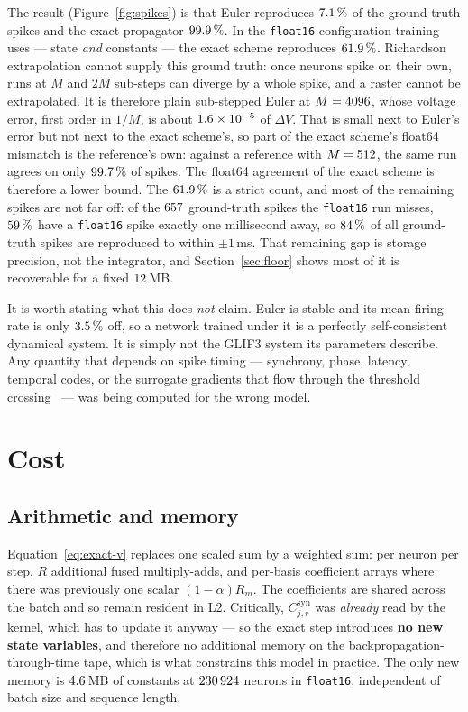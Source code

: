 \documentclass[11pt,a4paper,numbers=noenddot]{scrartcl}
\newcommand{\Csyn}{C^{\mathrm{syn}}}
\newcommand{\amem}{\alpha}
\newcommand{\code}[1]{\texttt{\small #1}}
\begin{document}
The result (Figure~\ref{fig:spikes}) is that Euler reproduces
$7.1\,\%$ of the ground-truth spikes and the exact propagator
$99.9\,\%$. In the \code{float16} configuration training uses --- state
\emph{and} constants --- the exact scheme reproduces $61.9\,\%$.
Richardson extrapolation cannot supply this ground truth: once neurons spike
on their own, runs at $M$ and $2M$ sub-steps can diverge by a whole spike,
and a raster cannot be extrapolated. It is therefore plain sub-stepped Euler
at $M = 4096$, whose voltage error, first order in $1/M$, is about
$1.6\times 10^{-5}$ of $\Delta V$. That is small next to Euler's error but not
next to the exact scheme's, so part of the exact scheme's float64 mismatch is
the reference's own: against a reference with $M = 512$, the
same run agrees on only $99.7\,\%$ of spikes. The float64
agreement of the exact scheme is therefore a lower bound.
The $61.9\,\%$ is a strict count, and most of the remaining
spikes are not far off: of the $657$ ground-truth spikes the
\code{float16} run misses, $59\,\%$ have a \code{float16} spike exactly
one millisecond away, so $84\,\%$ of all ground-truth spikes are
reproduced to within $\pm 1\,$ms. That remaining gap is storage precision, not
the integrator, and
Section~\ref{sec:floor} shows most of it is recoverable for a fixed
$12\,$MB.

It is worth stating what this does \emph{not} claim. Euler is stable and
its mean firing rate is only $3.5\,\%$ off, so a network trained
under it is a perfectly self-consistent dynamical system. It is simply not
the GLIF3 system its parameters describe. Any quantity that depends on spike
timing --- synchrony, phase, latency, temporal codes, or the surrogate
gradients that flow through the threshold
crossing~\cite{bellec2020solution} --- was being computed for the wrong model.

\section{Cost}
\label{sec:cost}

\subsection{Arithmetic and memory}

Equation~\eqref{eq:exact-v} replaces one scaled sum by a weighted sum: per
neuron per step, $R$ additional fused multiply-adds, and per-basis coefficient
arrays where there was previously one scalar $(1-\amem)R_m$. The coefficients
are shared across the batch and so remain resident in L2. Critically,
$\Csyn_{j,r}$ was \emph{already} read by the kernel, which has to update it
anyway --- so the exact step introduces \textbf{no new state variables}, and
therefore no additional memory on the backpropagation-through-time tape,
which is what constrains this model in practice. The only new memory is
$4.6\,$MB of constants at $230\,924$ neurons in
\code{float16}, independent of batch size and sequence length.
\end{document}
